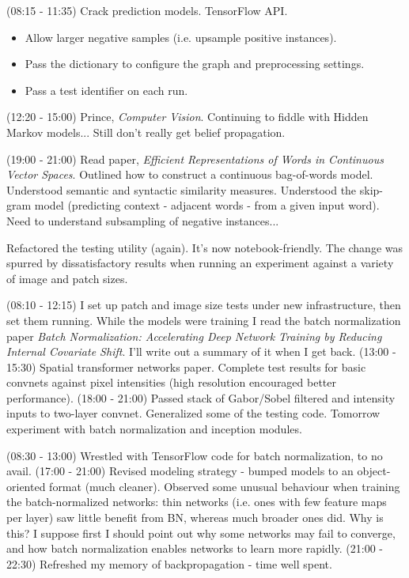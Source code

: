 \documentclass[idxtotoc,hyperref,openany]{labbook} %
\begin{document}
(08:15 - 11:35) Crack prediction models. TensorFlow API.
\begin{itemize}
	\item Allow larger negative samples (i.e. upsample positive instances).
	\item Pass the dictionary to configure the graph and preprocessing settings.
	\item Pass a test identifier on each run.
\end{itemize}

(12:20 - 15:00) Prince, \emph{Computer Vision}. Continuing to fiddle with Hidden Markov models... Still don't really get belief propagation.

(19:00 - 21:00) Read paper, \emph{Efficient Representations of Words in Continuous Vector Spaces}. Outlined how to construct a continuous bag-of-words model. Understood semantic and syntactic similarity measures. Understood the skip-gram model (predicting context - adjacent words - from a given input word). Need to understand subsampling of negative instances...


Refactored the testing utility (again). It's now notebook-friendly. The change was spurred by dissatisfactory results when running an experiment against a variety of image and patch sizes.

(08:10 - 12:15) I set up patch and image size tests under new infrastructure, then set them running. While the models were training I read the batch normalization paper \emph{Batch Normalization: Accelerating Deep Network Training by Reducing Internal Covariate Shift}. I'll write out a summary of it when I get back.
(13:00 - 15:30) Spatial transformer networks paper. Complete test results for basic convnets against pixel intensities (high resolution encouraged better performance).
(18:00 - 21:00) Passed stack of Gabor/Sobel filtered and intensity inputs to two-layer convnet. Generalized some of the testing code. Tomorrow experiment with batch normalization and inception modules.


(08:30 - 13:00) Wrestled with TensorFlow code for batch normalization, to no avail.
(17:00 - 21:00) Revised modeling strategy - bumped models to an object-oriented format (much cleaner). Observed some unusual behaviour when training the batch-normalized networks: thin networks (i.e. ones with few feature maps per layer) saw little benefit from BN, whereas much broader ones did. Why is this? I suppose first I should point out why some networks may fail to converge, and how batch normalization enables networks to learn more rapidly.
(21:00 - 22:30) Refreshed my memory of backpropagation - time well spent.
\end{document}
